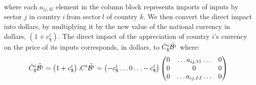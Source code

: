 \documentclass[11pt,a4paper]{paper} %
\begin{document}
where each ${{{a}}_{{ij,kl}}}$ element in the column block represents imports of inputs by sector $j$ in country $i~$from sector$~l$ of country $k$.
We then convert the direct impact into dollars, by multiplying it by the new value of the national currency in dollars, $\left(1+c_\$^i\right)$. The direct impact of the appreciation of country $i$’s currency on the price of its inputs corresponds, in dollars, to ${\tilde{C}_\$^i}{\tilde{{\cal B}^i}}$ where: 
\begin{eqnarray}
{\tilde{C}_\$^i}{\tilde{{\cal B}^i}}=\left(1+c_\$^i\right).C^i{\tilde{{\cal B}^i}}=
\left(-c_\$^i\ldots0\ldots-c_\$^i\right)\left(\begin{matrix}0&\ldots{{{a}}_{ij,11}}\ldots&0\\0&0&0\\0&\ldots{{a}_{{ij,IJ}}}\ldots&0\\\end{matrix}\right) 
\label{eq:eq4}
 \end{eqnarray}



\end{document}
